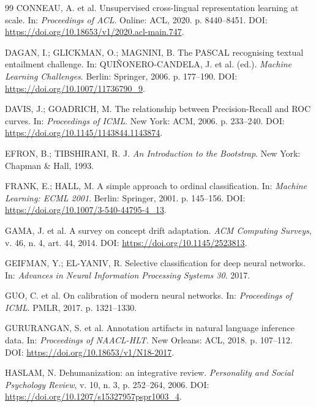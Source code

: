 \begin{thebibliography}{99}
CONNEAU, A. et al. Unsupervised cross-lingual representation learning at scale. In: \emph{Proceedings of ACL}. Online: ACL, 2020. p. 8440--8451. DOI: \url{https://doi.org/10.18653/v1/2020.acl-main.747}.

DAGAN, I.; GLICKMAN, O.; MAGNINI, B. The PASCAL recognising textual entailment challenge. In: QUIÑONERO-CANDELA, J. et al. (ed.). \emph{Machine Learning Challenges}. Berlin: Springer, 2006. p. 177--190. DOI: \url{https://doi.org/10.1007/11736790_9}.

DAVIS, J.; GOADRICH, M. The relationship between Precision-Recall and ROC curves. In: \emph{Proceedings of ICML}. New York: ACM, 2006. p. 233--240. DOI: \url{https://doi.org/10.1145/1143844.1143874}.

EFRON, B.; TIBSHIRANI, R. J. \emph{An Introduction to the Bootstrap}. New York: Chapman \& Hall, 1993.

FRANK, E.; HALL, M. A simple approach to ordinal classification. In: \emph{Machine Learning: ECML 2001}. Berlin: Springer, 2001. p. 145--156. DOI: \url{https://doi.org/10.1007/3-540-44795-4_13}.

GAMA, J. et al. A survey on concept drift adaptation. \emph{ACM Computing Surveys}, v. 46, n. 4, art. 44, 2014. DOI: \url{https://doi.org/10.1145/2523813}.

GEIFMAN, Y.; EL-YANIV, R. Selective classification for deep neural networks. In: \emph{Advances in Neural Information Processing Systems 30}. 2017.

GUO, C. et al. On calibration of modern neural networks. In: \emph{Proceedings of ICML}. PMLR, 2017. p. 1321--1330.

GURURANGAN, S. et al. Annotation artifacts in natural language inference data. In: \emph{Proceedings of NAACL-HLT}. New Orleans: ACL, 2018. p. 107--112. DOI: \url{https://doi.org/10.18653/v1/N18-2017}.

HASLAM, N. Dehumanization: an integrative review. \emph{Personality and Social Psychology Review}, v. 10, n. 3, p. 252--264, 2006. DOI: \url{https://doi.org/10.1207/s15327957pspr1003_4}.


\end{thebibliography}
